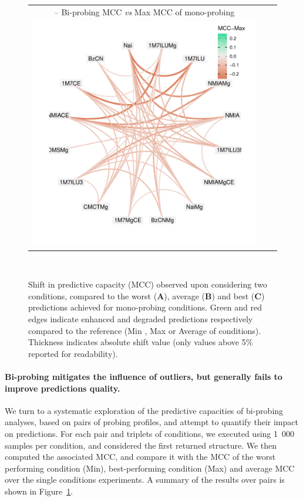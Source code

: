 \documentclass[a4,center,fleqn]{NAR}
\begin{document}
\begin{figure}
{\begin{tabular}{@{}c@{}c@{}c@{}}
			{\sf {\bfseries C} -- \relsize{-1}Bi-probing MCC \emph{vs} Max MCC of mono-probing}\\
			\includegraphics[width=\W\linewidth,trim=1cm 1cm .8cm .3cm,clip]{graphs/didy/MCC-vs-Max}\\
		\end{tabular}\\}
	\caption{Shift in \OurTool{} predictive capacity (MCC) observed upon considering two conditions, compared to the worst ({\sf\bfseries A}),  average ({\sf\bfseries B}) 
		and best ({\sf\bfseries C}) 
		predictions achieved for mono-probing conditions. Green and red edges indicate enhanced and degraded predictions respectively compared to the reference (Min%
		, Max 
		or Average of conditions). Thickness indicates absolute shift value (only values above 5\% reported for readability).\label{fig:pairwise}}
\end{figure}

\paragraph{Bi-probing mitigates the influence of outliers, but generally fails to improve predictions quality.}
We turn to a systematic exploration of the predictive capacities of bi-probing analyses, based on pairs of probing profiles, and attempt to quantify their impact on \OurTool predictions. For each pair and triplets of conditions, we executed \OurTool using 1~000 samples per condition, and considered the first returned structure. We then computed the associated MCC, and compare it with the MCC of the worst performing condition (Min), best-performing condition (Max) and average MCC over the single conditions experiments. A summary of the results over pairs is shown in Figure~\ref{fig:pairwise}. 
\end{document}
